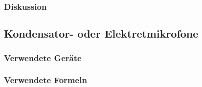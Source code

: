 \documentclass[12pt,a4paper]{article}
\begin{document}
\subsubsection*{Diskussion}



\subsection{Kondensator- oder Elektretmikrofone}
\subsubsection*{Verwendete Geräte}
\subsubsection*{Verwendete Formeln}
\end{document}
